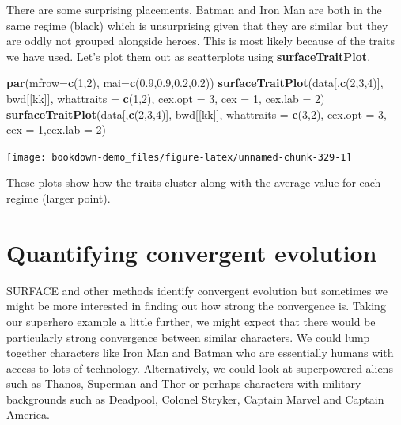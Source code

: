 \documentclass[
]{book}
\newenvironment{Shaded}{\begin{snugshade}}{\end{snugshade}}
\newcommand{\DataTypeTok}[1]{\textcolor[rgb]{0.13,0.29,0.53}{#1}}
\newcommand{\DecValTok}[1]{\textcolor[rgb]{0.00,0.00,0.81}{#1}}
\newcommand{\FloatTok}[1]{\textcolor[rgb]{0.00,0.00,0.81}{#1}}
\newcommand{\KeywordTok}[1]{\textcolor[rgb]{0.13,0.29,0.53}{\textbf{#1}}}
\newcommand{\NormalTok}[1]{#1}
\begin{document}
There are some surprising placements. Batman and Iron Man are both in the same regime (black) which is unsurprising given that they are similar but they are oddly not grouped alongside heroes. This is most likely because of the traits we have used. Let's plot them out as scatterplots using \textbf{surfaceTraitPlot}.

\begin{Shaded}
\begin{Highlighting}[]
\KeywordTok{par}\NormalTok{(}\DataTypeTok{mfrow=}\KeywordTok{c}\NormalTok{(}\DecValTok{1}\NormalTok{,}\DecValTok{2}\NormalTok{), }\DataTypeTok{mai=}\KeywordTok{c}\NormalTok{(}\FloatTok{0.9}\NormalTok{,}\FloatTok{0.9}\NormalTok{,}\FloatTok{0.2}\NormalTok{,}\FloatTok{0.2}\NormalTok{))}
\KeywordTok{surfaceTraitPlot}\NormalTok{(data[,}\KeywordTok{c}\NormalTok{(}\DecValTok{2}\NormalTok{,}\DecValTok{3}\NormalTok{,}\DecValTok{4}\NormalTok{)], bwd[[kk]], }\DataTypeTok{whattraits =} \KeywordTok{c}\NormalTok{(}\DecValTok{1}\NormalTok{,}\DecValTok{2}\NormalTok{),}
                 \DataTypeTok{cex.opt =} \DecValTok{3}\NormalTok{, }\DataTypeTok{cex =} \DecValTok{1}\NormalTok{, }\DataTypeTok{cex.lab =} \DecValTok{2}\NormalTok{)}
\KeywordTok{surfaceTraitPlot}\NormalTok{(data[,}\KeywordTok{c}\NormalTok{(}\DecValTok{2}\NormalTok{,}\DecValTok{3}\NormalTok{,}\DecValTok{4}\NormalTok{)], bwd[[kk]], }\DataTypeTok{whattraits =} \KeywordTok{c}\NormalTok{(}\DecValTok{3}\NormalTok{,}\DecValTok{2}\NormalTok{),  }
                 \DataTypeTok{cex.opt =} \DecValTok{3}\NormalTok{, }\DataTypeTok{cex =} \DecValTok{1}\NormalTok{,}\DataTypeTok{cex.lab =} \DecValTok{2}\NormalTok{)}
\end{Highlighting}
\end{Shaded}

\begin{center}\texttt{[image: bookdown-demo\_files/figure-latex/unnamed-chunk-329-1]} \end{center}

These plots show how the traits cluster along with the average value for each regime (larger point).

\hypertarget{quantifying-convergent-evolution}{%
\section{Quantifying convergent evolution}\label{quantifying-convergent-evolution}}

SURFACE and other methods identify convergent evolution but sometimes we might be more interested in finding out how strong the convergence is. Taking our superhero example a little further, we might expect that there would be particularly strong convergence between similar characters. We could lump together characters like Iron Man and Batman who are essentially humans with access to lots of technology. Alternatively, we could look at superpowered aliens such as Thanos, Superman and Thor or perhaps characters with military backgrounds such as Deadpool, Colonel Stryker, Captain Marvel and Captain America.
\end{document}
